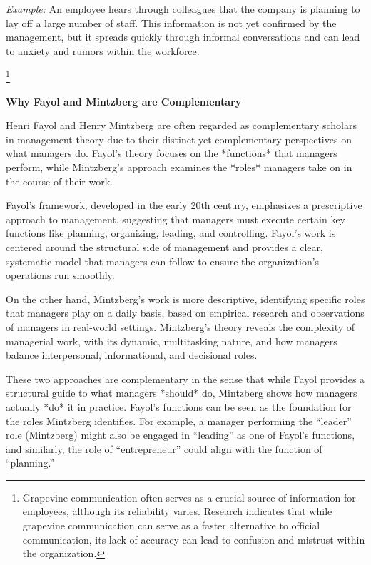 \documentclass[10pt,a4paper]{book}
\begin{document}
\textit{Example:} An employee hears through colleagues that the company is planning to lay off a large number of staff. This information is not yet confirmed by the management, but it spreads quickly through informal conversations and can lead to anxiety and rumors within the workforce.

\footnote{Grapevine communication often serves as a crucial source of information for employees, although its reliability varies. Research indicates that while grapevine communication can serve as a faster alternative to official communication, its lack of accuracy can lead to confusion and mistrust within the organization.}

\vspace{1cm}

\textbf{Why Fayol and Mintzberg are Complementary}

Henri Fayol and Henry Mintzberg are often regarded as complementary scholars in management theory due to their distinct yet complementary perspectives on what managers do. Fayol's theory focuses on the *functions* that managers perform, while Mintzberg’s approach examines the *roles* managers take on in the course of their work.

Fayol's framework, developed in the early 20th century, emphasizes a prescriptive approach to management, suggesting that managers must execute certain key functions like planning, organizing, leading, and controlling. Fayol’s work is centered around the structural side of management and provides a clear, systematic model that managers can follow to ensure the organization’s operations run smoothly.

On the other hand, Mintzberg’s work is more descriptive, identifying specific roles that managers play on a daily basis, based on empirical research and observations of managers in real-world settings. Mintzberg’s theory reveals the complexity of managerial work, with its dynamic, multitasking nature, and how managers balance interpersonal, informational, and decisional roles.

These two approaches are complementary in the sense that while Fayol provides a structural guide to what managers *should* do, Mintzberg shows how managers actually *do* it in practice. Fayol’s functions can be seen as the foundation for the roles Mintzberg identifies. For example, a manager performing the “leader” role (Mintzberg) might also be engaged in “leading” as one of Fayol’s functions, and similarly, the role of “entrepreneur” could align with the function of “planning.”
\end{document}
